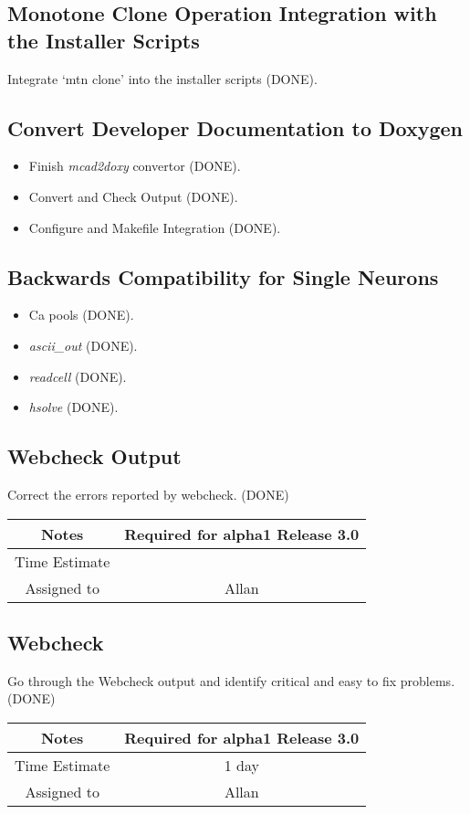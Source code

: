 \documentclass[12pt]{article}
\begin{document}
\subsection{Monotone Clone Operation Integration with the Installer Scripts}
Integrate `mtn clone' into the installer scripts (DONE).

\subsection{Convert Developer Documentation to Doxygen}

\begin{itemize}
\item Finish {\it mcad2doxy} convertor (DONE).
\item Convert and Check Output (DONE).
\item Configure and Makefile Integration (DONE).
\end{itemize}

\subsection{Backwards Compatibility for Single Neurons}

\begin{itemize}
\item Ca pools (DONE).
\item {\it ascii\_out} (DONE).
\item {\it readcell} (DONE).
\item {\it hsolve} (DONE).
\end{itemize}


\subsection{Webcheck Output}

Correct the errors reported by webcheck. (DONE)

{
  \vspace{5mm}
  \centering
  \begin{tabular}{|c|c|}
    \hline
    Notes
    & Required for alpha1 Release 3.0 \\
    \hline
    Time Estimate
    & \\
    \hline
    Assigned to
    & Allan \\
    \hline
  \end{tabular}
}

\subsection{Webcheck}

Go through the Webcheck output and identify critical and easy to fix
problems. (DONE)

{
  \vspace{5mm}
  \centering
  \begin{tabular}{|c|c|}
    \hline
    Notes
    & Required for alpha1 Release 3.0 \\
    \hline
    Time Estimate
    & 1 day \\
    \hline
    Assigned to
    & Allan \\
    \hline
  \end{tabular}
}
\end{document}
